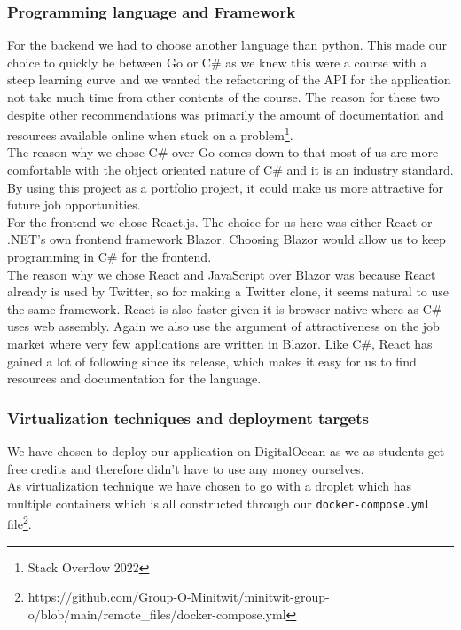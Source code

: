 \documentclass{article}
\begin{document}
\subsubsection{Programming language and Framework}
For the backend we had to choose another language than python. This made our choice to quickly be between Go or C\# as we knew this were a course with a steep learning curve and we wanted the refactoring of the API for the application not take much time from other contents of the course. The reason for these two despite other recommendations was primarily the amount of documentation and resources available online when stuck on a problem\footnote{Stack Overflow 2022}.\\
The reason why we chose C\# over Go comes down to that most of us are more comfortable with the object oriented nature of C\# and it is an industry standard. By using this project as a portfolio project, it could make us more attractive for future job opportunities.\\

For the frontend we chose React.js. The choice for us here was either React or .NET's own frontend framework Blazor. Choosing Blazor would allow us to keep programming in C\# for the frontend.\\

The reason why we chose React and JavaScript over Blazor was because React already is used by Twitter, so for making a Twitter clone, it seems natural to use the same framework. React is also faster given it is browser native where as C\# uses web assembly. Again we also use the argument of attractiveness on the job market where very few applications are written in Blazor. Like C\#, React has gained a lot of following since its release, which makes it easy for us to find resources and documentation for the language.


\subsubsection{Virtualization techniques and deployment targets}
We have chosen to deploy our application on DigitalOcean as we as students get free credits and therefore didn't have to use any money ourselves. \\
As virtualization technique we have chosen to go with a droplet which has multiple containers which is all constructed through our \verb|docker-compose.yml| file\footnote{https://github.com/Group-O-Minitwit/minitwit-group-o/blob/main/remote\_files/docker-compose.yml}. \\
\end{document}
